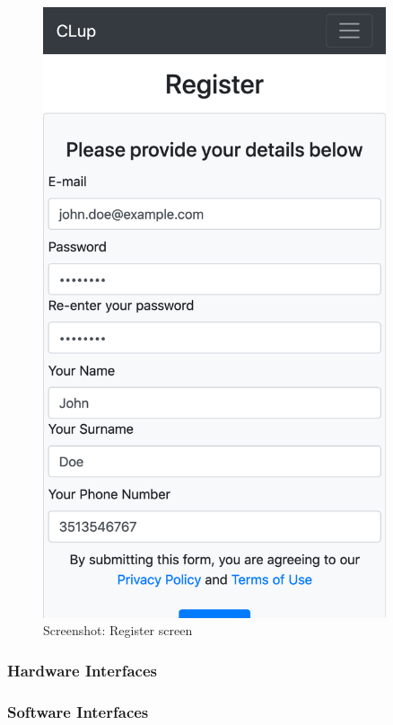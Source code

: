 \begin{figure}[H]
\begin{minipage}{0.45\textwidth}
        \includegraphics[width=0.9\textwidth]{Images/Screenshots/register.png} %
        \caption{Screenshot: Register screen}
    \end{minipage}
\end{figure}

\subsubsection{Hardware Interfaces}
\subsubsection{Software Interfaces}

